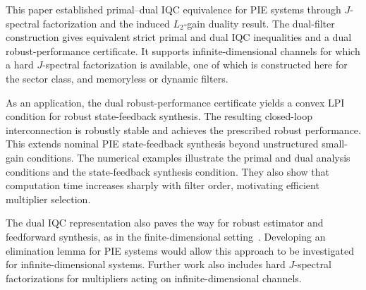 This paper established primal--dual IQC equivalence for PIE systems
through $J$-spectral factorization and the induced $L_2$-gain duality result.
The dual-filter construction gives equivalent strict primal and dual IQC
inequalities and a dual robust-performance certificate. It supports
infinite-dimensional channels for which a hard $J$-spectral factorization is
available, one of which is constructed here for the sector class, and memoryless
or dynamic filters.

As an application, the dual robust-performance certificate yields a
convex LPI condition for robust state-feedback synthesis. The resulting
closed-loop interconnection is robustly
stable and achieves the prescribed robust performance. This extends nominal PIE
state-feedback synthesis beyond unstructured small-gain conditions.
The numerical examples illustrate the primal and dual analysis conditions
and the state-feedback synthesis condition. They also show that
computation time increases sharply with filter order, motivating efficient
multiplier selection.

The dual IQC representation also paves the way for robust estimator and
feedforward synthesis, as in the finite-dimensional
setting~\cite{kose2009robust,venkataraman}. Developing an elimination lemma
for PIE systems would allow this approach to be investigated for
infinite-dimensional systems. Further work also includes hard
$J$-spectral factorizations for multipliers acting on infinite-dimensional
channels.
